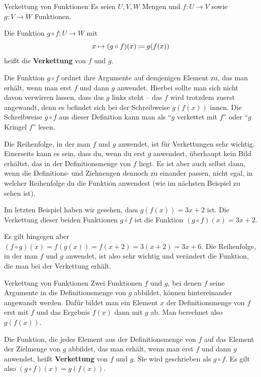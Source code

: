 \documentclass[../../main.tex]{subfiles}
\begin{document}
\begin{definition}{Verkettung von Funktionen}
    Es seien $U,V,W$ Mengen und $f\colon U\rightarrow V$ sowie $g\colon V\rightarrow W$ Funktionen.
    
    Die Funktion $g\circ f\colon U\rightarrow W$ mit \[x\mapsto (g\circ f)(x)\mathbin{\coloneqq} g(f(x))\] heißt die \textbf{Verkettung} von $f$ und $g$.
\end{definition}

Die Funktion $g\circ f$ ordnet ihre Argumente auf demjenigen Element zu, das man erhält, wenn man erst $f$ und dann $g$ anwendet. Hierbei sollte man sich nicht davon verwirren lassen, dass das $g$ links steht -- das $f$ wird trotzdem zuerst angewandt, denn es befindet sich bei der Schreibweise $g(f(x))$ innen. Die Schreibweise $g\circ f$ aus dieser Definition kann man als \enquote{$g$ verkettet mit $f$} oder \enquote{$g$ Kringel $f$} lesen.

Die Reihenfolge, in der man $f$ und $g$ anwendet, ist für Verkettungen sehr wichtig. Einerseits kann es sein, dass du, wenn du erst $g$ anwendest, überhaupt kein Bild erhältst, das in der Definitionsmenge von $f$ liegt. Es ist aber auch selbst dann, wenn die Definitions- und Zielmengen dennoch zu einander passen, nicht egal, in welcher Reihenfolge du die Funktion anwendest (wie im nächsten Beispiel zu sehen ist).

\begin{example}{}
    Im letzten Beispiel haben wir gesehen, dass $g(f(x))=3x+2$ ist. Die Verkettung dieser beiden Funktionen $g\circ f$ ist die Funktion $(g\circ f)(x)=3x+2$.
    
    Es gilt hingegen aber $(f\circ g)(x)=f(g(x))=f(x+2)=3(x+2)=3x+6$. Die Reihenfolge, in der man $f$ und $g$ anwendet, ist also sehr wichtig und verändert die Funktion, die man bei der Verkettung erhält.
\end{example}

\begin{nutshell}{Verkettung von Funktionen}
    \parpic[r]{}
    Zwei Funktionen $f$ und $g$, bei denen $f$ seine Argumente in die Definitionsmenge von $g$ abbildet, können hintereinander angewandt werden. Dafür bildet man ein Element $x$ der Definitionsmenge von $f$ erst mit $f$ und das Ergebnis $f(x)$ dann mit $g$ ab. Man berechnet also $g(f(x))$.
      
    Die Funktion, die jedes Element aus der Definitionsmenge von $f$ auf das Element der Zielmenge von $g$ abbildet, das man erhält, wenn man erst $f$ und dann $g$ anwendet, heißt \textbf{Verkettung} von $f$ und $g$. Sie wird geschrieben als $g\circ f$. Es gilt also $(g\circ f)(x)=g(f(x))$.
\end{nutshell}
\end{document}
